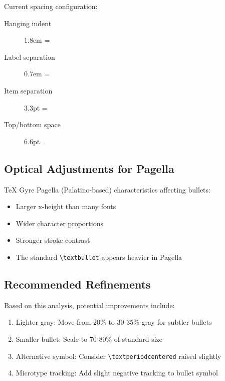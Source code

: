 \documentclass[11pt,letterpaper]{article}
\begin{document}
Current spacing configuration:
\begin{description}
\item[Hanging indent] 1.8em = \the\listhangindent
\item[Label separation] 0.7em = \the\listlabelsep  
\item[Item separation] 3.3pt = \the\listquarterbaseline
\item[Top/bottom space] 6.6pt = \the\listhalfbaseline
\end{description}

\subsection{Optical Adjustments for Pagella}

TeX Gyre Pagella (Palatino-based) characteristics affecting bullets:
\begin{itemize}
\item Larger x-height than many fonts
\item Wider character proportions
\item Stronger stroke contrast
\item The standard \texttt{\textbackslash textbullet} appears heavier in Pagella
\end{itemize}

\subsection{Recommended Refinements}

Based on this analysis, potential improvements include:
\begin{enumerate}
\item Lighter gray: Move from 20\% to 30-35\% gray for subtler bullets
\item Smaller bullet: Scale to 70-80\% of standard size
\item Alternative symbol: Consider \texttt{\textbackslash textperiodcentered} raised slightly
\item Microtype tracking: Add slight negative tracking to bullet symbol
\end{enumerate}
\end{document}
